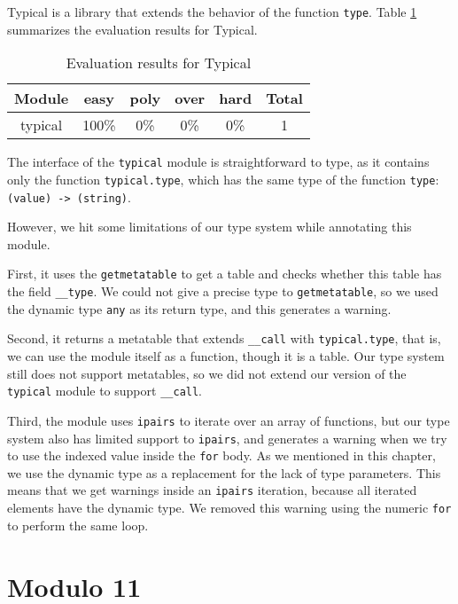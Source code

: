 Typical is a library that extends the behavior of the function \texttt{type}. 
Table \ref{tab:evaltypical} summarizes the evaluation results for Typical.

\begin{table}[!ht]
\begin{center}
\begin{tabular}{|c|c|c|c|c|c|}
\hline
\textbf{Module} & \textbf{easy} & \textbf{poly} & \textbf{over} & \textbf{hard} & \textbf{Total} \\
\hline
typical & 100\% & 0\% & 0\% & 0\% & 1 \\ %
\hline
\end{tabular}
\end{center}
\caption{Evaluation results for Typical}
\label{tab:evaltypical}
\end{table}

The interface of the \texttt{typical} module is straightforward to type,
as it contains only the function \texttt{typical.type},
which has the same type of the function \texttt{type}: \texttt{(value) -> (string)}.

However, we hit some limitations of our type system while annotating this module.

First, it uses the \texttt{getmetatable} to get a table and
checks whether this table has the field \texttt{\string_\string_type}.
We could not give a precise type to \texttt{getmetatable}, so we used the dynamic
type \texttt{any} as its return type, and this generates a warning.

Second, it returns a metatable that extends \texttt{\string_\string_call}
with \texttt{typical.type}, that is, we can use the module itself as a function,
though it is a table.
Our type system still does not support metatables, so we did not extend our version
of the \texttt{typical} module to support \texttt{\string_\string_call}.

Third, the module uses \texttt{ipairs} to iterate over an array of functions,
but our type system also has limited support to \texttt{ipairs}, and generates
a warning when we try to use the indexed value inside the \texttt{for} body.
As we mentioned in this chapter, we use the dynamic type as a replacement for
the lack of type parameters.
This means that we get warnings inside an \texttt{ipairs} iteration, because
all iterated elements have the dynamic type.
We removed this warning using the numeric \texttt{for} to perform the same loop.

\section{Modulo 11}

